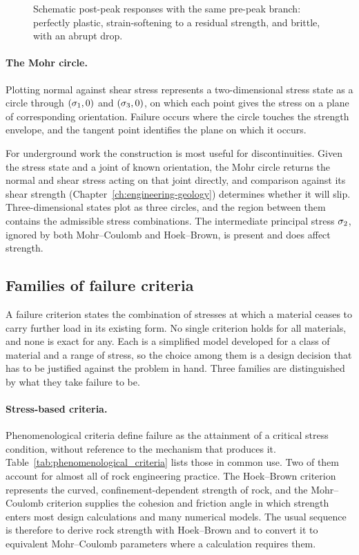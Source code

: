 \begin{figure}[htbp]
\centering
{}
\caption{Schematic post-peak responses with the same pre-peak branch: perfectly plastic, strain-softening to a residual strength, and brittle, with an abrupt drop.}
\label{fig:post-peak-behaviour}
\end{figure}

\paragraph{The Mohr circle.}
Plotting normal against shear stress represents a two-dimensional stress state
as a circle through $(\sigma_1,0)$ and $(\sigma_3,0)$, on which each point gives
the stress on a plane of corresponding orientation. Failure occurs where the
circle touches the strength envelope, and the tangent point identifies the
plane on which it occurs.

For underground work the construction is most useful for discontinuities.
Given the stress state and a joint of known orientation, the Mohr circle
returns the normal and shear stress acting on that joint directly, and
comparison against its shear strength (Chapter~\ref{ch:engineering-geology})
determines whether it will slip. Three-dimensional states plot as three
circles, and the region between them contains the admissible stress
combinations. The intermediate principal stress $\sigma_2$, ignored by both
Mohr--Coulomb and Hoek--Brown, is present and does affect strength.

\subsection{Families of failure criteria}
\label{sec:material-failure-theory}

A failure criterion states the combination of stresses at which a material
ceases to carry further load in its existing form. No single criterion holds
for all materials, and none is exact for any. Each is a simplified model
developed for a class of material and a range of stress, so the choice among
them is a design decision that has to be justified against the problem in
hand. Three families are distinguished by what they take failure to be.

\paragraph{Stress-based criteria.}
Phenomenological criteria define failure as the attainment of a critical
stress condition, without reference to the mechanism that produces it.
Table~\ref{tab:phenomenological_criteria} lists those in common use. Two of
them account for almost all of rock engineering practice. The Hoek--Brown criterion
represents the curved, confinement-dependent strength of rock, and the
Mohr--Coulomb criterion supplies the cohesion and friction angle in which
strength enters most design calculations and many numerical models. The usual
sequence is therefore to derive rock strength with Hoek--Brown and to convert
it to equivalent Mohr--Coulomb parameters where a calculation requires them.

